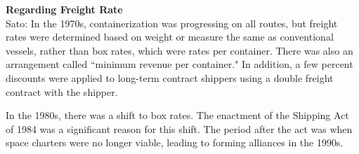 \documentclass[11pt]{article}
\begin{document}


\textbf{Regarding Freight Rate}  \\
Sato: In the 1970s, containerization was progressing on all routes, but freight rates were determined based on weight or measure the same as conventional vessels, rather than box rates, which were rates per container. There was also an arrangement called ``minimum revenue per container." In addition, a few percent discounts were applied to long-term contract shippers using a double freight contract with the shipper. 

In the 1980s, there was a shift to box rates. The enactment of the Shipping Act of 1984 was a significant reason for this shift. The period after the act was when space charters were no longer viable, leading to forming alliances in the 1990s.

\end{document}
